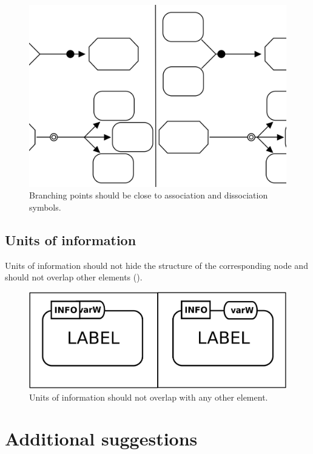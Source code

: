 \begin{figure}[htb]
  \centering
  \includegraphics[scale=0.3]{images/layout-branching}
  \caption{Branching points should be close to association and dissociation symbols.}\label{fig:branching}
\end{figure}

\subsection{Units of information}

Units of information should not hide the structure of the
corresponding node and should not overlap other
elements ().

\begin{figure}[htb]
  \centering
  \includegraphics[scale=0.5]{images/layout-unit-information}
  \caption{Units of information should not overlap with any
  other element.}\label{fig:layout7}
\end{figure}

\section{Additional suggestions}

